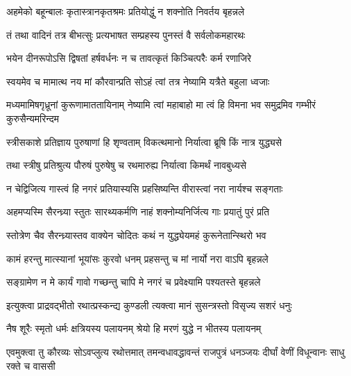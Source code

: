 \twolineshloka
{अहमेको बहून्बालः कृतास्त्रानकृतश्रमः}
{प्रतियोद्धुं न शक्नोति निवर्तय बृहन्नले}



\twolineshloka
{तं तथा वादिनं तत्र बीभत्सुः प्रत्यभाषत}
{सम्प्रहस्य पुनस्तं वै सर्वलोकमहारथः}


\twolineshloka
{भयेन दीनरूपोऽसि द्विषतां हर्षवर्धनः}
{न च तावत्कृतं किञ्चित्परैः कर्म रणाजिरे}


\twolineshloka
{स्वयमेव च मामात्थ नय मां कौरवान्प्रति}
{सोऽहं त्वां तत्र नेष्यामि यत्रैते बहुला ध्वजाः}


\threelineshloka
{मध्यमामिषगृध्रूनां कुरूणामाततायिनाम्}
{नेष्यामि त्वां महाबाहो मा त्वं हि विमना भव}
{समुद्रमिव गम्भीरं कुरुसैन्यमरिन्दम}


\twolineshloka
{स्त्रीसकाशे प्रतिज्ञाय पुरुषाणां हि शृण्वताम्}
{विकत्थमानो निर्यात्वा ब्रूषि किं नात्र युद्ध्यसे}


\twolineshloka
{तथा स्त्रीषु प्रतिश्रुत्य पौरुषं पुरुषेषु च}
{रथमारुह्य निर्यात्वा किमर्थं नावबुध्यसे}


\twolineshloka
{न चेद्विजित्य गास्त्वं हि नगरं प्रतियास्यसि}
{प्रहसिष्यन्ति वीरास्त्वां नरा नार्यश्च सङ्गताः}


\twolineshloka
{अहमप्यस्मि सैरन्ध्र्या स्तुतः सारथ्यकर्मणि}
{नाहं शक्नोम्यनिर्जित्य गाः प्रयातुं पुरं प्रति}


\twolineshloka
{स्तोत्रेण चैव सैरन्ध्र्यास्तव वाक्येन चोदितः}
{कथं न युद्ध्येयमहं कुरूनेतान्स्थिरो भव}




\twolineshloka
{कामं हरन्तु मात्स्यानां भूयांसः कुरवो धनम्}
{प्रहसन्तु च मां नार्यो नरा वाऽपि बृहन्नले}


\twolineshloka
{सङ्ग्रामेण न मे कार्यं गावो गच्छन्तु चापि मे}
{नगरं च प्रवेक्ष्यामि पश्यतस्ते बृहन्नले}



\twolineshloka
{इत्युक्त्वा प्राद्रवद्भीतो रथात्प्रस्कन्द्य कुण्डली}
{त्यक्त्वा मानं सुसन्त्रस्तो विसृज्य सशरं धनुः}




\twolineshloka
{नैष शूरैः स्मृतो धर्मः क्षत्रियस्य पलायनम्}
{श्रेयो हि मरणं युद्धे न भीतस्य पलायनम्}



\threelineshloka
{एवमुक्त्वा तु कौरव्यः सोऽवप्लुत्य रथोत्तमात्}
{तमन्वधावद्धावन्तं राजपुत्रं धनञ्जयः}
{दीर्घां वेणीं विधून्वानः साधु रक्ते च वाससी}


